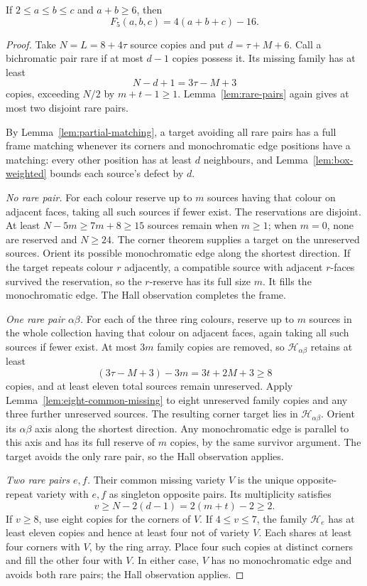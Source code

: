 \begin{theorem}\label{thm:boxes-wide}
If $2\le a\le b\le c$ and $a+b\ge6$, then
\[
 F_5(a,b,c)=4(a+b+c)-16.
\]
\end{theorem}
\begin{proof}
Take $N=L=8+4\tau$ source copies and put $d=\tau+M+6$. Call a bichromatic
pair rare if at most $d-1$ copies possess it. Its missing family has
at least
\[
 N-d+1=3\tau-M+3
\]
copies, exceeding $N/2$ by $m+t-1\ge1$. Lemma~\ref{lem:rare-pairs}
again gives at most two disjoint rare pairs.

By Lemma~\ref{lem:partial-matching}, a target avoiding all rare pairs
has a full frame matching whenever its corners and monochromatic edge
positions have a matching: every other position has at least $d$
neighbours, and Lemma~\ref{lem:box-weighted} bounds each source's defect
by $d$.

\emph{No rare pair.} For each colour reserve up to $m$ sources having
that colour on adjacent faces, taking all such sources if fewer exist.
The reservations are disjoint. At least $N-5m\ge7m+8\ge15$ sources
remain when $m\ge1$; when $m=0$, none are reserved and $N\ge24$.
The corner theorem supplies a target on the unreserved sources.
Orient its possible monochromatic edge along the shortest direction.
If the target repeats colour $r$ adjacently, a compatible source with
adjacent $r$-faces survived the reservation, so the $r$-reserve has its
full size $m$. It fills the monochromatic edge. The Hall observation
completes the frame.

\emph{One rare pair $\alpha\beta$.} For each of the three ring colours,
reserve up to $m$ sources in the whole collection having that colour
on adjacent faces, again taking all such sources if fewer exist.
At most $3m$ family copies are removed, so $\mathcal H_{\alpha\beta}$ retains at least
\[
 (3\tau-M+3)-3m=3t+2M+3\ge8
\]
copies, and at least eleven total sources remain unreserved. Apply
Lemma~\ref{lem:eight-common-missing} to eight unreserved family copies
and any three further unreserved sources. The resulting corner target
lies in $\mathcal H_{\alpha\beta}$. Orient its $\alpha\beta$ axis along the shortest
direction. Any monochromatic edge is parallel to this axis and has its
full reserve of $m$ copies, by the same survivor argument. The target
avoids the only rare pair, so the Hall observation applies.

\emph{Two rare pairs $e,f$.} Their common missing variety $V$ is the
unique opposite-repeat variety with $e,f$ as singleton opposite pairs.
Its multiplicity satisfies
\[
 v\ge N-2(d-1)=2(m+t)-2\ge2.
\]
If $v\ge8$, use eight copies for the corners of $V$. If $4\le v\le7$,
the family $\mathcal H_e$ has at least eleven copies and hence at least
four not of variety $V$. Each shares at least four corners with $V$,
by the ring array. Place four such copies at distinct corners and fill
the other four with $V$. In either case, $V$ has no monochromatic edge
and avoids both rare pairs; the Hall observation applies.


\end{proof}
